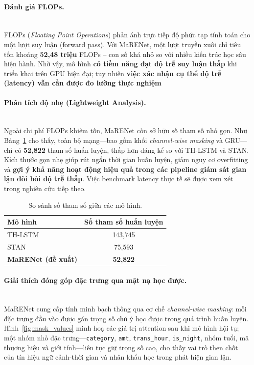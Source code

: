 \paragraph{Đánh giá FLOPs.}
\mbox{}\\
FLOPs (\textit{Floating Point Operations}) phản ánh trực tiếp độ phức tạp tính toán cho một lượt suy luận (forward pass).  
Với MaRENet, một lượt truyền xuôi chỉ tiêu tốn khoảng \textbf{52{,}48 triệu} FLOPs – con số khá nhỏ so với nhiều kiến trúc học sâu hiện hành.  
Nhờ vậy, mô hình \textbf{có tiềm năng đạt độ trễ suy luận thấp} khi triển khai trên GPU hiện đại; tuy nhiên \textbf{việc xác nhận cụ thể độ trễ (latency) vẫn cần được đo lường thực nghiệm} 

\paragraph{Phân tích độ nhẹ (Lightweight Analysis).}
\mbox{}\\
Ngoài chi phí FLOPs khiêm tốn, MaRENet còn sở hữu số tham số nhỏ gọn. Như Bảng~\ref{tab:params} cho thấy, toàn bộ mạng—bao gồm khối \emph{channel-wise masking} và GRU—chỉ có \textbf{52{,}822} tham số huấn luyện, thấp hơn đáng kể so với TH-LSTM và STAN.  
Kích thước gọn nhẹ giúp rút ngắn thời gian huấn luyện, giảm nguy cơ overfitting và \textbf{gợi ý khả năng hoạt động hiệu quả trong các pipeline giám sát gian lận đòi hỏi độ trễ thấp}. Việc benchmark latency thực tế sẽ được xem xét trong nghiên cứu tiếp theo.

\begin{table}[H]
\centering
\small
\begin{tabular}{|l|c|}
\hline
\textbf{Mô hình} & \textbf{Số tham số huấn luyện} \\
\hline
TH-LSTM        & 143{,}745 \\
STAN           & 75{,}593  \\
\textbf{MaRENet (đề xuất)} & \textbf{52{,}822} \\
\hline
\end{tabular}
\caption{So sánh số tham số giữa các mô hình.}
\label{tab:params}
\end{table}

\paragraph{Giải thích đóng góp đặc trưng qua mặt nạ học được.}
\mbox{}\\
MaRENet cung cấp tính minh bạch thông qua cơ chế \emph{channel-wise masking}: mỗi đặc trưng đầu vào được gán trọng số chú ý học được trong quá trình huấn luyện.  
Hình~\ref{fig:mask_values} minh hoạ các giá trị attention sau khi mô hình hội tụ; một nhóm nhỏ đặc trưng—\texttt{category}, \texttt{amt}, \texttt{trans\_hour}, \texttt{is\_night}, nhóm tuổi, mã thương hiệu và giới tính—liên tục giữ trọng số cao, cho thấy vai trò then chốt của tín hiệu ngữ cảnh-thời gian và nhân khẩu học trong phát hiện gian lận.

